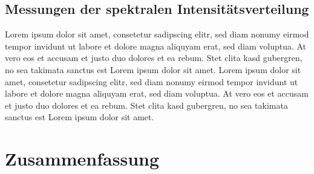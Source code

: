 \documentclass[a4paper,twoside,final]{article}
\begin{document}
\subsection{Messungen der spektralen Intensitätsverteilung}
Lorem ipsum dolor sit amet, consetetur sadipscing elitr, sed diam nonumy eirmod tempor invidunt ut labore et dolore magna aliquyam erat, sed diam voluptua. At vero eos et accusam et justo duo dolores et ea rebum. Stet clita kasd gubergren, no sea takimata sanctus est Lorem ipsum dolor sit amet. Lorem ipsum dolor sit amet, consetetur sadipscing elitr, sed diam nonumy eirmod tempor invidunt ut labore et dolore magna aliquyam erat, sed diam voluptua. At vero eos et accusam et justo duo dolores et ea rebum. Stet clita kasd gubergren, no sea takimata sanctus est Lorem ipsum dolor sit amet.

\newpage
\section{Zusammenfassung}

\appendix
\end{document}
